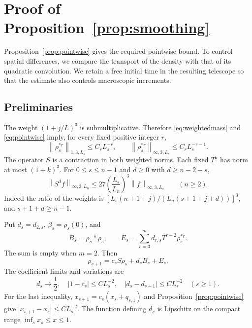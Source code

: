 \documentclass[11pt,letterpaper,reqno]{amsart}
\theoremstyle{plain}
\newcommand{\norm}[1]{\left\lVert#1\right\rVert}
\begin{document}
\section{Proof of Proposition~\ref{prop:smoothing}}\label{sec:smoothing}
Proposition~\ref{prop:pointwise} gives the required pointwise bound. To control spatial differences, we compare the transport of the density with that of its quadratic convolution. We retain a free initial time in the resulting telescope so that the estimate also controls macroscopic increments.
\subsection{Preliminaries}
The weight $(1+j/L)^3$ is submultiplicative. Therefore \eqref{eq:weightedmass} and \eqref{eq:pointwise} imply, for every fixed positive integer $r$,
\begin{equation}\label{eq:convnorms}
 \norm{\rho_s^{*r}}_{1,3,L_s}\le C_rL_s^{-r},\qquad
 \norm{\rho_s^{*r}}_{\infty,3,L_s}\le C_rL_s^{-r-1}.
\end{equation}
The operator $S$ is a contraction in both weighted norms. Each fixed $T^k$ has norm at most $(1+k)^3$. For $0\le s\le n-1$ and $d\ge0$ with $d\ge n-2-s$,
\begin{equation}\label{eq:shiftgain}
 \norm{S^df}_{\infty,3,L_n}\le27\left(\frac{L_s}{L_n}\right)^3
 \norm f_{\infty,3,L_s}\qquad(n\ge2).
\end{equation}
Indeed the ratio of the weights is
$[L_s(n+1+j)/(L_n(s+1+j+d))]^3$, and $s+1+d\ge n-1$.

Put $d_s=d_{2,s}$, $\beta_s=\rho_s(0)$, and
\[
 B_s=\rho_s*\rho_s,\qquad E_s=\sum_{r=3}^m d_{r,s}T^{r-2}\rho_s^{*r}.
\]
The sum is empty when $m=2$. Then
\begin{equation}\label{eq:rhoshort}
 \rho_{s+1}=c_sS\rho_s+d_sB_s+E_s.
\end{equation}
The coefficient limits and variations are
\begin{equation}\label{eq:coefficientbounds}
 d_s\longrightarrow\frac12,\quad |1-c_s|\le CL_s^{-2},\quad
 |d_s-d_{s-1}|\le CL_s^{-2}\quad(s\ge1).
\end{equation}
For the last inequality, $x_{s+1}=c_s(x_s+q_{s,1})$ and Proposition~\ref{prop:pointwise} give $|x_{s+1}-x_s|\le CL_s^{-2}$. The function defining $d_s$ is Lipschitz on the compact range $\inf_sx_s\le x\le1$.
\end{document}
